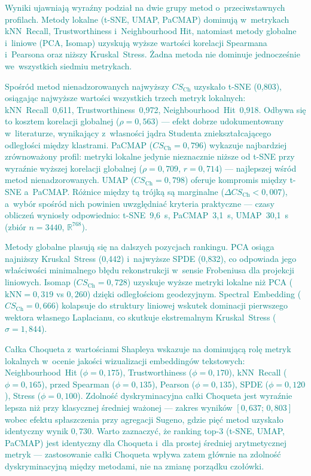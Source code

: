 \documentclass[a4paper,11pt,twocolumn]{article}
\newcommand{\hlme}[1]{\textcolor{teal}{#1}}
\begin{document}
\hlme{Wyniki ujawniają wyraźny podział na dwie grupy metod
o~przeciwstawnych profilach.
Metody lokalne (t-SNE, UMAP, PaCMAP) dominują w~metrykach
kNN~Recall, Trustworthiness i~Neighbourhood Hit,
natomiast metody globalne i~liniowe (PCA, Isomap) uzyskują
wyższe wartości korelacji Spearmana i~Pearsona oraz niższy Kruskal~Stress.
Żadna metoda nie dominuje jednocześnie we~wszystkich siedmiu metrykach.

Spośród metod nienadzorowanych najwyższy $CS_\text{Ch}$ uzyskało t-SNE
(0,803), osiągając najwyższe wartości wszystkich trzech metryk lokalnych:
kNN~Recall~0,611, Trustworthiness~0,972, Neighbourhood~Hit~0,918.
Odbywa się to kosztem korelacji globalnej ($\rho=0{,}563$) ---
efekt dobrze udokumentowany w~literaturze, wynikający z~własności
jądra Studenta zniekształcającego odległości między klastrami.
PaCMAP ($CS_\text{Ch}=0{,}796$) wykazuje najbardziej zrównoważony profil:
metryki lokalne jedynie nieznacznie niższe od t-SNE przy wyraźnie wyższej
korelacji globalnej ($\rho=0{,}709$, $r=0{,}714$) --- najlepszej
wśród metod nienadzorowanych.
UMAP ($CS_\text{Ch}=0{,}798$) oferuje kompromis między t-SNE a~PaCMAP.
Różnice między tą trójką są marginalne ($\Delta CS_\text{Ch} < 0{,}007$),
a~wybór spośród nich powinien uwzględniać kryteria praktyczne ---
czasy obliczeń wyniosły odpowiednio: t-SNE~9,6~s, PaCMAP~3,1~s,
UMAP~30,1~s (zbiór $n=3440$, $\mathbb{R}^{768}$).

Metody globalne plasują się na dalszych pozycjach rankingu.
PCA osiąga najniższy Kruskal~Stress (0,442) i~najwyższe SPDE (0,832),
co odpowiada jego właściwości minimalnego błędu rekonstrukcji
w~sensie Frobeniusa dla projekcji liniowych.
Isomap ($CS_\text{Ch}=0{,}728$) uzyskuje wyższe metryki lokalne niż PCA
($\text{kNN}=0{,}319$ vs $0{,}260$) dzięki odległościom geodezyjnym.
Spectral~Embedding ($CS_\text{Ch}=0{,}666$) kolapsuje do struktury liniowej
wskutek dominacji pierwszego wektora własnego Laplacianu, co skutkuje
ekstremalnym Kruskal~Stress ($\sigma=1{,}844$).

Całka Choqueta z~wartościami Shapleya wskazuje na dominującą rolę
metryk lokalnych w~ocenie jakości wizualizacji embeddingów tekstowych:
Neighbourhood~Hit ($\phi=0{,}175$), Trustworthiness ($\phi=0{,}170$),
kNN~Recall ($\phi=0{,}165$), przed Spearman ($\phi=0{,}135$),
Pearson ($\phi=0{,}135$), SPDE ($\phi=0{,}120$), Stress ($\phi=0{,}100$).
Zdolność dyskryminacyjna całki Choqueta jest wyraźnie lepsza niż
przy klasycznej średniej ważonej --- zakres wyników
$[0{,}637;\,0{,}803]$ wobec efektu spłaszczenia przy agregacji Sugeno,
gdzie pięć metod uzyskało identyczny wynik $0{,}730$.
\hlme{Warto zaznaczyć, że ranking top-3 (t-SNE, UMAP, PaCMAP) jest
identyczny dla Choqueta i~dla prostej średniej arytmetycznej metryk ---
zastosowanie całki Choqueta wpływa zatem głównie na zdolność
dyskryminacyjną między metodami, nie na zmianę porządku czołówki.}}
\end{document}
